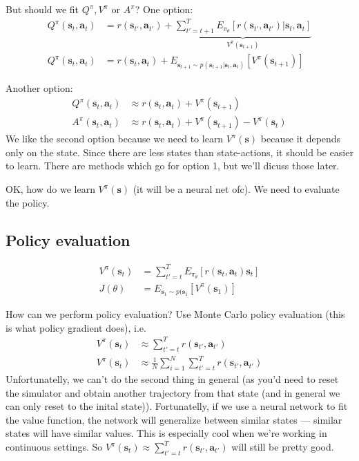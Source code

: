 \documentclass{report}
\begin{document}
But should we fit $Q^\pi, V^\pi$ or $A^\pi$?
One option:
\begin{align}
Q^\pi (\bm{s}_{t}, \bm{a}_{t})  &= r(\bm{s}_{t'}, \bm{a}_{t'}) + \underbrace{\sum_{t'=t+1}^{T} E_{\pi_\theta} \left[ r(\bm{s}_{t'}, \bm{a}_{t'})|\bm{s}_t, \bm{a}_t \right]}_{V^\pi(\bm{s}_{t+1})} \\
Q^\pi (\bm{s}_{t}, \bm{a}_{t})  &= r(\bm{s}_{t}, \bm{a}_{t}) + E_{\bm{s}_{t+1} \sim p(\bm{s}_{t+1}|\bm{s}_t, \bm{a}_t)} \left[ V^\pi (\bm{s}_{t+1}) \right] 
\end{align}

Another option:
\begin{align}
		Q^{\pi} (\bm{s}_{t}, \bm{a}_{t})  &\approx r(\bm{s}_{t}, \bm{a}_{t}) + V^\pi (\bm{s}_{t+1}) \\
		A^\pi (\bm{s}_{t}, \bm{a}_{t})  &\approx r(\bm{s}_{t}, \bm{a}_{t}) + V^\pi (\bm{s}_{t+1})  - V^\pi(\bm{s}_t)
\end{align}
We like the second option because we need to learn $V^\pi(\bm{s})$ because it depends only on the state.
Since there are less states than state-actions, it should be easier to learn.
There are methods which go for option 1, but we'll dicuss those later.

OK, how do we learn $V^\pi(\bm{s})$ (it will be a neural net ofc).
We need to evaluate the policy.

\subsection{Policy evaluation}
\begin{align}
		V^\pi(\bm{s}_t) &= \sum_{t'=t}^{T} E_{\pi_\theta} \left[ r(\bm{s}_{t}, \bm{a}_{t})\bm{s}_t \right] \\
		J(\theta) &= E_{\bm{s}_1 \sim p(\bm{s}_1} \left[ V^\pi (\bm{s}_1) \right] 
\end{align}

How can we perform policy evaluation? 
Use Monte Carlo policy evaluation (this is what policy gradient does), i.e.
\begin{align}
		V^\pi (\bm{s}_t) &\approx \sum_{t'=t}^{T} r(\bm{s}_{t'}, \bm{a}_{t'})\\
V^\pi (\bm{s}_t) &\approx \frac{1}{N} \sum_{i=1}^{N} \sum_{t'=t}^{T} r(\bm{s}_{t'}, \bm{a}_{t'})
\end{align}
Unfortunatelly, we can't do the second thing in general (as you'd need to reset the simulator and obtain 
another trajectory from that state (and in general we can only reset to the inital state)).
Fortunatelly, if we use a neural network to fit the value function, the network will generalize between similar states ---
similar states will have similar values. This is especially cool when we're working in continuous settings.
So $V^\pi (\bm{s}_t) \approx \sum_{t'=t}^{T} r(\bm{s}_{t'}, \bm{a}_{t'})$ will still be pretty good.
\end{document}
